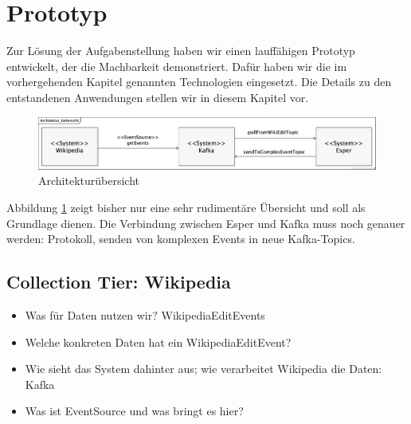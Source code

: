 \section{Prototyp}
Zur Lösung der Aufgabenstellung haben wir einen lauffähigen Prototyp entwickelt, der die Machbarkeit demonstriert.
Dafür haben wir die im vorhergehenden Kapitel genannten Technologien eingesetzt. Die Details zu den entstandenen
Anwendungen stellen wir in diesem Kapitel vor.

\begin{figure}[h]
    \includegraphics[width=.5\textwidth]{images/Architektur_Uebersicht.png}
    \caption{Architekturübersicht}
    \label{fig:architektur_uebersicht}
\end{figure}

Abbildung \ref{fig:architektur_uebersicht} zeigt bisher nur eine sehr rudimentäre Übersicht und soll als Grundlage dienen.
Die Verbindung zwischen Esper und Kafka muss noch genauer werden: Protokoll, senden von komplexen Events in neue Kafka-Topics.

\subsection{Collection Tier: Wikipedia}
\begin{itemize}
    \item Was für Daten nutzen wir? WikipediaEditEvents
    \item Welche konkreten Daten hat ein WikipediaEditEvent?
    \item Wie sieht das System dahinter aus; wie verarbeitet Wikipedia die Daten: Kafka
    \item Was ist EventSource und was bringt es hier?
\end{itemize}

